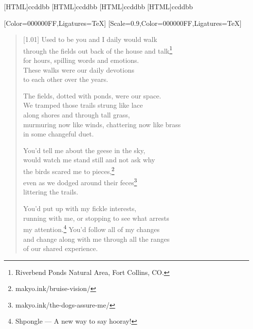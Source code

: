 [HTML]{ccddbb}
[HTML]{ccddbb}
[HTML]{ccddbb}
[HTML]{ccddbb}
\begin{paracol}{2}
  \begin{leftcolumn}
[Color=000000FF,Ligatures=TeX]
\renewfontfamily{}[Scale=0.9,Color=000000FF,Ligatures=TeX]

\begin{verse}[1.01\textwidth]
Used to be you and I daily would walk\\
through the fields out back of the house and talk\footnote{Riverbend Ponds Natural Area, Fort Collins, CO.}\\
for hours, spilling words and emotions.\\
These walks were our daily devotions\\
to each other over the years.

The fields, dotted with ponds, were our space.\\
We tramped those trails strung like lace\\
along shores and through tall grass,\\
murmuring now like winds, chattering now like brass\\
in some changeful duet.

You'd tell me about the geese in the sky,\\
would watch me stand still and not ask why\\
the birds scared me to pieces,\footnote{makyo.ink/bruise-vision/}\\
even as we dodged around their feces\footnote{makyo.ink/the-dogs-assure-me/}\\
littering the trails.

You'd put up with my fickle interests,\\
running with me, or stopping to see what arrests\\
my attention.\footnote{Shpongle --- A new way to say hooray!} You'd follow all of my changes\\
and change along with me through all the ranges\\
of our shared experience.
\end{verse}
\newpage
\end{leftcolumn}
\end{paracol}

